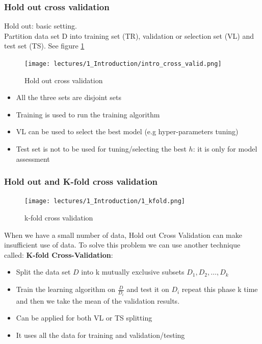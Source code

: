\documentclass[../main.tex]{subfiles}
\begin{document}
\subsubsection{Hold out cross validation}
Hold out: basic setting.\\ 
Partition data set D into training set (TR), validation or selection set (VL) and test set (TS). See figure \ref{fig:intro_cross_valid}
\begin{figure}[H]
    \centering
    \texttt{[image: lectures/1\_Introduction/intro\_cross\_valid.png]}
    \caption{Hold out cross validation}
    \label{fig:intro_cross_valid}
\end{figure}

\begin{itemize}
    \item All the three sets are disjoint sets
    \item Training is used to run the training algorithm
    \item VL can be used to select the best model (e.g hyper-parameters tuning)
    \item Test set is not to be used for tuning/selecting the best $h$: it is only for model assessment
\end{itemize}

\subsubsection{Hold out and K-fold cross validation}
\begin{figure}
    \centering
    \texttt{[image: lectures/1\_Introduction/1\_kfold.png]}
    \caption{k-fold cross validation}
    \label{fig:1_kfold}
\end{figure}
When we have a small number of data, Hold out Cross Validation can make insufficient use of data. To solve this problem we can use another technique called: \textbf{K-fold Cross-Validation}:

\begin{itemize}
    \item Split the data set $D$ into k mutually exclusive subsets $D_1,D_2,\dots,D_k$
    \item Train the learning algorithm on $\frac{D}{D_{i}}$ and test it on $D_i$ repeat this phase k time and then we take the mean of the validation results.
    \item Can be applied for both VL or TS splitting
    \item It uses all the data for training and validation/testing
\end{itemize}
\end{document}
